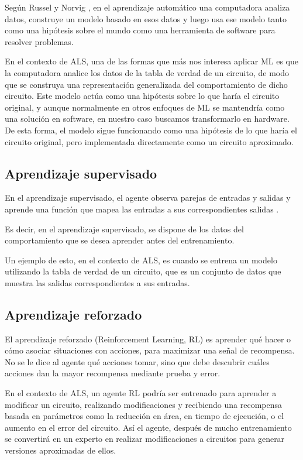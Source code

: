 Según Russel y Norvig \cite{russell2016artificial}, en el aprendizaje
automático una computadora analiza datos, construye un modelo basado en esos
datos y luego usa ese modelo tanto como una hipótesis sobre el mundo como una
herramienta de software para resolver problemas.

En el contexto de ALS, una de las formas que más nos interesa aplicar ML es
que la computadora analice los datos de la tabla de verdad de un circuito,
de modo que se construya una representación generalizada del comportamiento de
dicho circuito.
Este modelo actúa como una hipótesis sobre lo que haría el circuito original, y
aunque normalmente en otros enfoques de ML se mantendría como una solución en
software, en nuestro caso buscamos transformarlo en hardware. De esta forma, el
modelo sigue funcionando como una hipótesis de lo que haría el circuito
original, pero implementada directamente como un circuito aproximado.

\subsection{Aprendizaje supervisado}

En el aprendizaje supervisado, el agente observa parejas de entradas y salidas
y aprende una función que mapea las entradas a sus correspondientes salidas
\cite{russell2016artificial}.

Es decir, en el aprendizaje supervisado, se dispone de los datos del
comportamiento que se desea aprender antes del entrenamiento.

Un ejemplo de esto, en el contexto de ALS, es cuando se entrena un modelo
utilizando la tabla de verdad de un circuito, que es un conjunto de datos que
muestra las salidas correspondientes a sus entradas.

\subsection{Aprendizaje reforzado}

El aprendizaje reforzado (Reinforcement Learning, RL) es aprender qué hacer o
cómo asociar situaciones con acciones, para maximizar una señal de recompensa.
No se le dice al agente qué acciones tomar, sino que debe descubrir cuáles
acciones dan la mayor recompensa mediante prueba y error.
\cite{sutton_reinforcement_2018}

En el contexto de ALS, un agente RL podría ser entrenado para aprender a
modificar un circuito, realizando modificaciones y recibiendo una recompensa
basada en parámetros como la reducción en área, en tiempo de ejecución, o el
aumento en el error del circuito. Así el agente, después de mucho entrenamiento
se convertirá en un experto en realizar modificaciones a circuitos para generar
versiones aproximadas de ellos.

